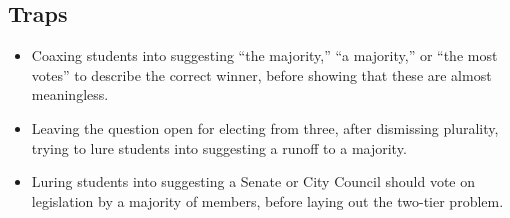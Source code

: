 \subsection{Traps}

\begin{itemize}
    \item Coaxing students into suggesting ``the majority,'' ``a majority,'' or ``the most votes'' to describe the correct winner, before showing that these are almost meaningless.

    \item Leaving the question open for electing from three, after dismissing plurality, trying to lure students into suggesting a runoff to a majority.

    \item Luring students into suggesting a Senate or City Council should vote on legislation by a majority of members, before laying out the two-tier problem.
\end{itemize}